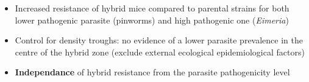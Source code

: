 \documentclass[24pt, a0paper, portrait, margin=5mm, innermargin=5mm,
               blockverticalspace=10mm, blocktitlewidthratio=0.5, colspace=10mm, 
               subcolspace=10mm]{tikzposter}
\begin{document}
{\begin{multicols*}{2}
      \end{multicols*}
      
% 
% 
}

{

\begin{itemize}
  \item Increased resistance of hybrid mice compared to parental strains for both lower pathogenic parasite (pinworms) and high pathogenic one (\textit{Eimeria})
  \item Control for density troughs: no evidence of a lower parasite prevalence in the centre of the hybrid zone (exclude external ecological epidemiological factors)
  \item \textbf{Independance} of hybrid resistance from the parasite pathogenicity level
  
\end{itemize}
}



\begin{columns} 
   
   
\end{columns}

\end{document}
